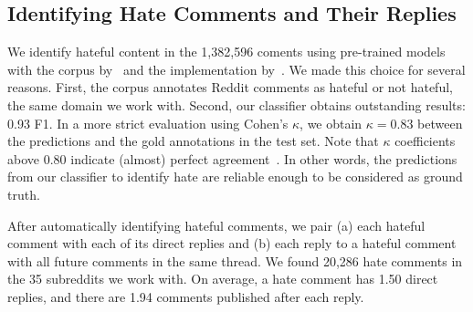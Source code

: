 \documentclass[11pt]{article}
\begin{document}
\subsection{Identifying Hate Comments and Their Replies}
\label{ss:identify}
We identify hateful content in the 1,382,596 coments using pre-trained models \cite{DBLP:journals/corr/abs-1907-11692} with the corpus by~\citet{qian-etal-2019-benchmark}
and
the implementation by~\citet{phang2020jiant}.
We made this choice for several reasons.
First, the corpus annotates Reddit comments as hateful or not hateful, the same domain we work with.
Second, our classifier obtains outstanding results: 0.93 F1.
In a more strict evaluation using Cohen's $\kappa$, we obtain $\kappa=0.83$ between the predictions and the gold annotations in the test set.
Note that $\kappa$ coefficients above $0.80$ indicate (almost) perfect agreement~\cite{artstein2008inter}.
In other words, the predictions from our classifier to identify hate are reliable enough to be considered as ground truth.

\begin{comment}
\begin{table}
\small
\begin{tabular}{lrrr}
\toprule
& \#hate & Avg. replies & Avg. hate after \\ \midrule
subreddit1 & 0 & 0 & 0 \\
\\ \bottomrule
\end{tabular}
\caption{Number of hate comments in each subreddit we work with,
average number of replies to each hate comment,
and average number of comments published after the reply.
Summary sentence. Summary sentence. Summary sentence. Summary sentence.}
\label{t:counts}
\end{table}
\end{comment}

After automatically identifying hateful comments, we pair
(a) each hateful comment with each of its direct replies
and
(b) each reply to a hateful comment with all future comments in the same thread.
We found 20,286  hate comments in the 35 subreddits we work with.
On average, a hate comment has 1.50 direct replies,
and there are 1.94 comments published after each reply.

\end{document}

